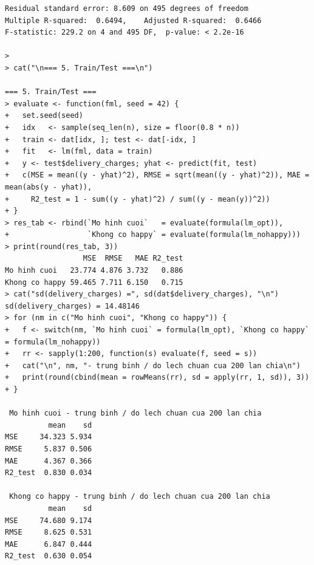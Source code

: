 \documentclass[12pt, a4paper]{article}
\begin{document}
\begin{lstlisting}
Residual standard error: 8.609 on 495 degrees of freedom
Multiple R-squared:  0.6494,	Adjusted R-squared:  0.6466 
F-statistic: 229.2 on 4 and 495 DF,  p-value: < 2.2e-16

> 
> cat("\n=== 5. Train/Test ===\n")

=== 5. Train/Test ===
> evaluate <- function(fml, seed = 42) {
+   set.seed(seed)
+   idx   <- sample(seq_len(n), size = floor(0.8 * n))
+   train <- dat[idx, ]; test <- dat[-idx, ]
+   fit   <- lm(fml, data = train)
+   y <- test$delivery_charges; yhat <- predict(fit, test)
+   c(MSE = mean((y - yhat)^2), RMSE = sqrt(mean((y - yhat)^2)), MAE = mean(abs(y - yhat)),
+     R2_test = 1 - sum((y - yhat)^2) / sum((y - mean(y))^2))
+ }
> res_tab <- rbind(`Mo hinh cuoi`   = evaluate(formula(lm_opt)),
+                  `Khong co happy` = evaluate(formula(lm_nohappy)))
> print(round(res_tab, 3))
                  MSE  RMSE   MAE R2_test
Mo hinh cuoi   23.774 4.876 3.732   0.886
Khong co happy 59.465 7.711 6.150   0.715
> cat("sd(delivery_charges) =", sd(dat$delivery_charges), "\n")
sd(delivery_charges) = 14.48146 
> for (nm in c("Mo hinh cuoi", "Khong co happy")) {
+   f <- switch(nm, `Mo hinh cuoi` = formula(lm_opt), `Khong co happy` = formula(lm_nohappy))
+   rr <- sapply(1:200, function(s) evaluate(f, seed = s))
+   cat("\n", nm, "- trung binh / do lech chuan cua 200 lan chia\n")
+   print(round(cbind(mean = rowMeans(rr), sd = apply(rr, 1, sd)), 3))
+ }

 Mo hinh cuoi - trung binh / do lech chuan cua 200 lan chia
          mean    sd
MSE     34.323 5.934
RMSE     5.837 0.506
MAE      4.367 0.366
R2_test  0.830 0.034

 Khong co happy - trung binh / do lech chuan cua 200 lan chia
          mean    sd
MSE     74.680 9.174
RMSE     8.625 0.531
MAE      6.847 0.444
R2_test  0.630 0.054
\end{lstlisting}
\end{document}
